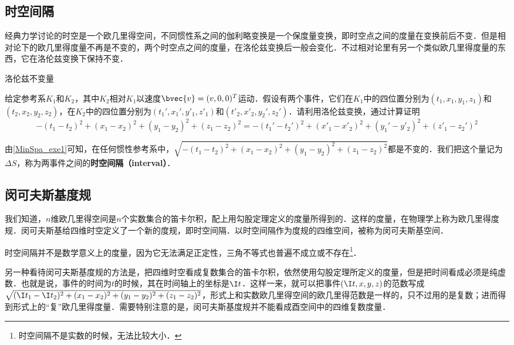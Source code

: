 

\subsection{时空间隔}
经典力学讨论的时空是一个欧几里得空间，不同惯性系之间的伽利略变换是一个保度量变换，即时空点之间的度量在变换前后不变．但是相对论下的欧几里得度量不再是不变的，两个时空点之间的度量，在洛伦兹变换后一般会变化．不过相对论里有另一个类似欧几里得度量的东西，它在洛伦兹变换下保持不变．

\begin{exercise}{洛伦兹不变量}\label{MinSpa_exe1}

给定参考系$K_1$和$K_2$，其中$K_2$相对$K_1$以速度$\bvec{v}=(v,0,0)^T$运动．假设有两个事件，它们在$K_1$中的四位置分别为$(t_1, x_1, y_1, z_1)$和$(t_2, x_2, y_2, z_2)$，在$K_2$中的四位置分别为$(t_1', x_1', y'_1, z'_1)$和$(t'_2, x'_2, y_2', z_2')$．请利用洛伦兹变换，通过计算证明
\begin{equation}
-(t_1-t_2)^2+(x_1-x_2)^2+(y_1-y_2)^2+(z_1-z_2)^2=-(t_1'-t_2')^2+(x'_1-x'_2)^2+(y_1'-y'_2)^2+(z'_1-z_2')^2
\end{equation}
\end{exercise}

由\autoref{MinSpa_exe1}可知，在任何惯性参考系中，$\sqrt{-(t_1-t_2)^2+(x_1-x_2)^2+(y_1-y_2)^2+(z_1-z_2)^2}$都是不变的．我们把这个量记为$\Delta S$，称为两事件之间的\textbf{时空间隔（interval）}．

\subsection{闵可夫斯基度规}

我们知道，$n$维欧几里得空间是$n$个实数集合的笛卡尔积，配上用勾股定理定义的度量所得到的．这样的度量，在物理学上称为欧几里得度规．闵可夫斯基给四维时空定义了一个新的度规，即时空间隔．以时空间隔作为度规的四维空间，被称为闵可夫斯基空间．

时空间隔并不是数学意义上的度量，因为它无法满足正定性，三角不等式也普遍不成立或不存在\footnote{时空间隔不是实数的时候，无法比较大小．}．

另一种看待闵可夫斯基度规的方法是，把四维时空看成复数集合的笛卡尔积，依然使用勾股定理所定义的度量，但是把时间看成必须是纯虚数．也就是说，事件的时间为$t$的时候，其在时间轴上的坐标是$\I t$．这样一来，就可以把事件$(\I t, x, y, z)$的范数写成$\sqrt{(\I t_1-\I t_2)^2+(x_1-x_2)^2+(y_1-y_2)^2+(z_1-z_2)^2}$，形式上和实数欧几里得空间的欧几里得范数是一样的，只不过用的是复数；进而得到形式上的“复”欧几里得度量．需要特别注意的是，闵可夫斯基度规并不能看成酉空间中的四维复数度量．

